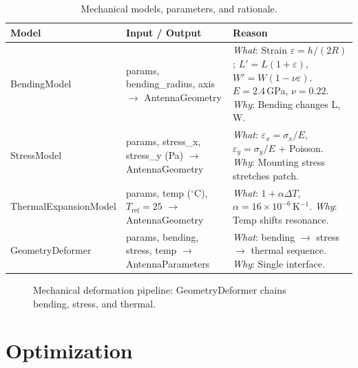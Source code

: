 \documentclass[11pt,a4paper]{article}
\begin{document}
\begin{table}[htbp]
\centering
\small
\begin{tabularx}{\textwidth}{@{}lXX@{}}
\toprule
\textbf{Model} & \textbf{Input / Output} & \textbf{Reason} \\
\midrule
BendingModel & params, bending\_radius, axis $\to$ AntennaGeometry & \emph{What}: Strain $\varepsilon=h/(2R)$; $L'=L(1+\varepsilon)$, $W'=W(1-\nu\varepsilon)$. $E=2.4$\,GPa, $\nu=0.22$. \emph{Why}: Bending changes L, W. \\
\addlinespace
StressModel & params, stress\_x, stress\_y (Pa) $\to$ AntennaGeometry & \emph{What}: $\varepsilon_x=\sigma_x/E$, $\varepsilon_y=\sigma_y/E$ + Poisson. \emph{Why}: Mounting stress stretches patch. \\
\addlinespace
ThermalExpansionModel & params, temp ($^\circ$C), $T_{\mathrm{ref}}=25$ $\to$ AntennaGeometry & \emph{What}: $1+\alpha\Delta T$, $\alpha=16\times10^{-6}$\,K$^{-1}$. \emph{Why}: Temp shifts resonance. \\
\addlinespace
GeometryDeformer & params, bending, stress, temp $\to$ AntennaParameters & \emph{What}: bending $\to$ stress $\to$ thermal sequence. \emph{Why}: Single interface. \\
\bottomrule
\end{tabularx}
\caption{Mechanical models, parameters, and rationale.}
\end{table}

\begin{figure}[htbp]
\centering
{}
\caption{Mechanical deformation pipeline: GeometryDeformer chains bending, stress, and thermal.}
\end{figure}

\section{Optimization}
\end{document}
